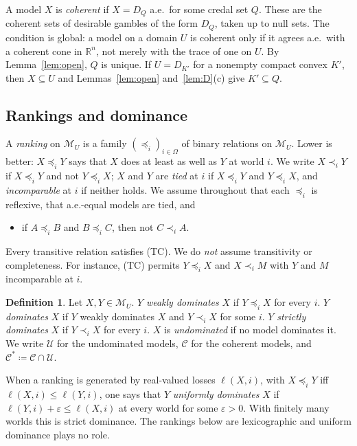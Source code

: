 \documentclass[11pt]{article}
\newcommand{\R}{\mathbb{R}}
\newcommand{\M}{\mathcal{M}}
\theoremstyle{plain}
\theoremstyle{definition}
\newtheorem{definition}[theorem]{Definition}
\theoremstyle{remark}
\begin{document}
A model $X$ is \emph{coherent} if $X=D_Q$ a.e.\ for some credal set $Q$. These are the
coherent sets of desirable gambles of the form $D_Q$, taken up to null sets. The
condition is global: a model on a domain $U$ is coherent only if it agrees a.e.\ with a
coherent cone in $\R^n$, not merely with the trace of one on $U$. By
Lemma~\ref{lem:open}, $Q$ is unique. If $U=D_{K'}$ for a nonempty compact convex $K'$, then
$X\subseteq U$ and Lemmas~\ref{lem:open} and~\ref{lem:D}(c) give $K'\subseteq Q$.

\subsection{Rankings and dominance}

A \emph{ranking} on $\M_U$ is a family $(\preceq_i)_{i\in\Omega}$ of binary relations on
$\M_U$. Lower is better: $X\preceq_iY$ says that $X$ does at least as well as $Y$ at world
$i$. We write $X\prec_iY$ if $X\preceq_iY$ and not $Y\preceq_iX$; $X$ and $Y$ are
\emph{tied} at $i$ if $X\preceq_iY$ and $Y\preceq_iX$, and \emph{incomparable} at $i$ if
neither holds. We assume throughout that each $\preceq_i$ is reflexive, that a.e.-equal
models are tied, and
\begin{itemize}
  \item[(TC)] if $A\preceq_iB$ and $B\preceq_iC$, then not $C\prec_iA$.
\end{itemize}
Every transitive relation satisfies (TC). We do \emph{not} assume transitivity or
completeness. For instance, (TC) permits $Y\preceq_iX$ and $X\prec_iM$ with $Y$ and $M$
incomparable at $i$.

\begin{definition}\label{def:dom}
Let $X,Y\in\M_U$. $Y$ \emph{weakly dominates} $X$ if $Y\preceq_iX$ for every $i$. $Y$
\emph{dominates} $X$ if $Y$ weakly dominates $X$ and $Y\prec_iX$ for some $i$. $Y$
\emph{strictly dominates} $X$ if $Y\prec_iX$ for every $i$. $X$ is \emph{undominated} if
no model dominates it. We write $\mathcal U$ for the undominated models, $\mathcal C$ for
the coherent models, and $\mathcal C^\ast\coloneqq\mathcal C\cap\mathcal U$.
\end{definition}

When a ranking is generated by real-valued losses $\ell(X,i)$, with $X\preceq_iY$ iff
$\ell(X,i)\le\ell(Y,i)$, one says that $Y$ \emph{uniformly dominates} $X$ if
$\ell(Y,i)+\varepsilon\le\ell(X,i)$ at every world for some $\varepsilon>0$. With finitely
many worlds this is strict dominance. The rankings below are lexicographic and uniform
dominance plays no role.
\end{document}
